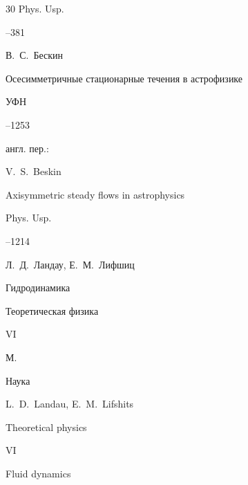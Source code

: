 {\begin{thebibliography}{30}
\jour Phys. Usp.




--381







\by В.~С.~Бескин

\paper Осесимметричные стационарные течения в астрофизике

\jour УФН




--1253



\transl

англ. пер.:~

\by V.~S.~Beskin  

\paper Axisymmetric steady flows in astrophysics

\jour Phys. Usp.




--1214





\by Л.~Д.~Ландау, Е.~М.~Лифшиц

\volinfo Гидродинамика

\book Теоретическая физика

\bookvol VI

\publaddr М.

\publ Наука



\misctransl

\by L.~D.~Landau,  E.~M.~Lifshits

\book Theoretical physics

\bookvol VI

\volinfo Fluid dynamics


\end{thebibliography}}
